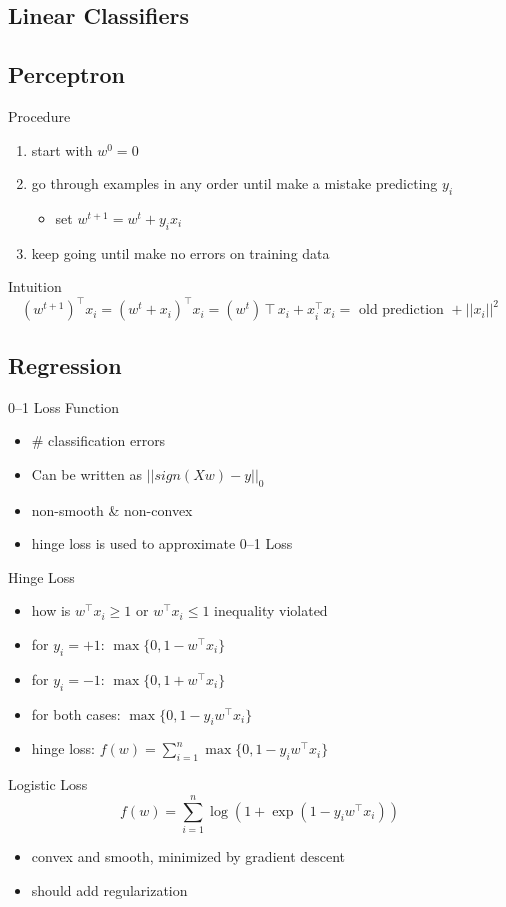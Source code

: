 \documentclass[10pt,landscape,a4paper]{article}
\begin{document}
\begin{multicols*}{5}
\section{Linear Classifiers}

\subsection{Perceptron}
Procedure
\begin{enumerate}
    \item start with \(w^0 = 0\)
    \item go through examples in any order until make a mistake predicting \(y_i\)
    \begin{itemize}
        \item set \(w^{t+1} = w^t + y_i x_i\)
    \end{itemize}
    \item keep going until make no errors on training data
\end{enumerate}
Intuition
\begin{dmath*}
    (w^{t+1})^\intercal x_i = (w^t + x_i)^\intercal x_i = (w^t)\intercal x_i + x_i^\intercal x_i = \text{ old prediction } + ||x_i||^2
\end{dmath*}

\subsection{Regression}
0--1 Loss Function
\begin{itemize}
    \item \# classification errors
    \item Can be written as \(||sign(Xw) - y||_0\)
    \item non-smooth \& non-convex
    \item hinge loss is used to approximate 0--1 Loss
\end{itemize}
Hinge Loss
\begin{itemize}
    \item how is \(w^\intercal x_i \geq 1\) or \(w^\intercal x_i \leq 1\) inequality violated
    \item for \(y_i=+1\): \(\max{\{0,1-w^\intercal x_i\}}\)
    \item for \(y_i=-1\): \(\max{\{0,1+w^\intercal x_i\}}\)
    \item for both cases: \(\max{\{0,1-y_i w^\intercal x_i\}}\)
    \item hinge loss: \(f(w)=\sum_{i=1}^{n}\max{\{0,1-y_i w^\intercal x_i\}}\)
\end{itemize}
Logistic Loss
\begin{dmath*}
    f(w) = \sum_{i=1}^{n}\log{(1+\exp{(1-y_i w^\intercal x_i)})}
\end{dmath*}
\begin{itemize}
    \item convex and smooth, minimized by gradient descent
    \item should add regularization
\end{itemize}


\end{multicols*}
\end{document}
